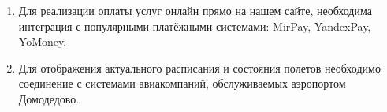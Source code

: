 
\begin{enumerate}
    \item Для реализации оплаты услуг онлайн прямо
          на нашем сайте, необходима интеграция с 
          популярными платёжными системами: 
          MirPay, YandexPay, YoMoney.
          
    \item Для отображения актуального
          расписания и состояния полетов необходимо 
          соединение с системами авиакомпаний, 
          обслуживаемых аэропортом Домодедово.
\end{enumerate}

